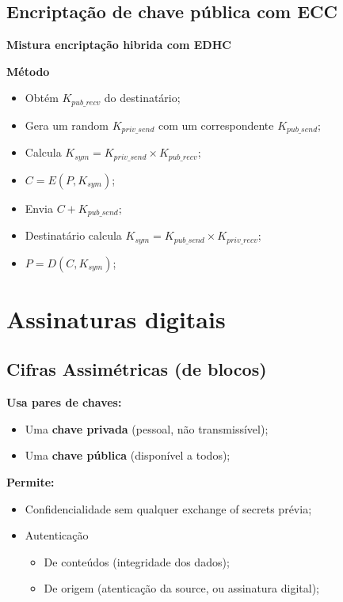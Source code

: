 \documentclass{article}
\begin{document}
\subsection{Encriptação de chave pública com ECC}

\begin{flushleft}
  \textbf{Mistura encriptação hibrida com EDHC}

  \pagebreak

  \textbf{Método}
  \begin{itemize}
    \item Obtém $K_{pub\_recv}$ do destinatário;
    \item Gera um random $K_{priv\_send}$ com um correspondente $K_{pub\_send}$;
    \item Calcula $K_{sym} = K_{priv\_send} \times K_{pub\_recv}$;
    \item $C = E(P, K_{sym})$;
    \item Envia $C + K_{pub\_send}$;
    \vspace{2mm}
    \item Destinatário calcula $K_{sym} = K_{pub\_send} \times K_{priv\_recv}$;
    \item $P = D(C, K_{sym})$;
  \end{itemize}
\end{flushleft}

\section{Assinaturas digitais}

\subsection{Cifras Assimétricas (de blocos)}

\begin{flushleft}
  \textbf{Usa pares de chaves:}
  \begin{itemize}
    \item Uma \textbf{chave privada} (pessoal, não transmissível);
    \item Uma \textbf{chave pública} (disponível a todos);
  \end{itemize}

  \vspace{2mm}

  \textbf{Permite:}
  \begin{itemize}
    \item Confidencialidade sem qualquer exchange of secrets prévia;
    \item Autenticação
    \begin{itemize}
      \item De conteúdos (integridade dos dados);
      \item De origem (atenticação da source, ou assinatura digital);
    \end{itemize}
  \end{itemize}
\end{flushleft}
\end{document}

